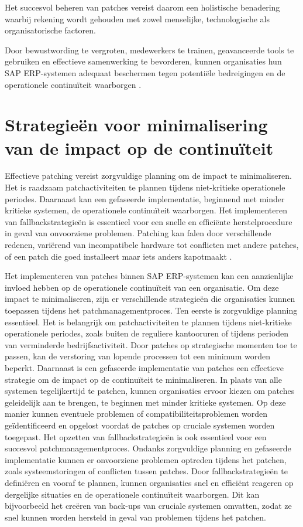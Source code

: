 Het succesvol beheren van patches vereist daarom een holistische benadering waarbij rekening wordt gehouden met zowel menselijke, technologische als organisatorische factoren.

Door bewustwording te vergroten, medewerkers te trainen, geavanceerde tools te gebruiken en effectieve samenwerking te bevorderen, kunnen organisaties hun SAP ERP-systemen adequaat beschermen tegen potentiële bedreigingen en de operationele continuïteit waarborgen \autocite{Graffeo2018}.


\section{Strategieën voor minimalisering van de impact op de continuïteit}
Effectieve patching vereist zorgvuldige planning om de impact te minimaliseren. Het is raadzaam patchactiviteiten te plannen tijdens niet-kritieke operationele periodes. Daarnaast kan een gefaseerde implementatie, beginnend met minder kritieke systemen, de operationele continuïteit waarborgen. Het implementeren van fallbackstrategieën is essentieel voor een snelle en efficiënte herstelprocedure in geval van onvoorziene problemen. Patching kan falen door verschillende redenen, variërend van incompatibele hardware tot conflicten met andere patches, of een patch die goed installeert maar iets anders kapotmaakt \autocite{Shein2022}.

Het implementeren van patches binnen SAP ERP-systemen kan een aanzienlijke invloed hebben op de operationele continuïteit van een organisatie. Om deze impact te minimaliseren, zijn er verschillende strategieën die organisaties kunnen toepassen tijdens het patchmanagementproces. Ten eerste is zorgvuldige planning essentieel. Het is belangrijk om patchactiviteiten te plannen tijdens niet-kritieke operationele periodes, zoals buiten de reguliere kantooruren of tijdens perioden van verminderde bedrijfsactiviteit. Door patches op strategische momenten toe te passen, kan de verstoring van lopende processen tot een minimum worden beperkt. Daarnaast is een gefaseerde implementatie van patches een effectieve strategie om de impact op de continuïteit te minimaliseren. In plaats van alle systemen tegelijkertijd te patchen, kunnen organisaties ervoor kiezen om patches geleidelijk aan te brengen, te beginnen met minder kritieke systemen. Op deze manier kunnen eventuele problemen of compatibiliteitsproblemen worden geïdentificeerd en opgelost voordat de patches op cruciale systemen worden toegepast. Het opzetten van fallbackstrategieën is ook essentieel voor een succesvol patchmanagementproces. Ondanks zorgvuldige planning en gefaseerde implementatie kunnen er onvoorziene problemen optreden tijdens het patchen, zoals systeemstoringen of conflicten tussen patches. Door fallbackstrategieën te definiëren en vooraf te plannen, kunnen organisaties snel en efficiënt reageren op dergelijke situaties en de operationele continuïteit waarborgen. Dit kan bijvoorbeeld het creëren van back-ups van cruciale systemen omvatten, zodat ze snel kunnen worden hersteld in geval van problemen tijdens het patchen.

